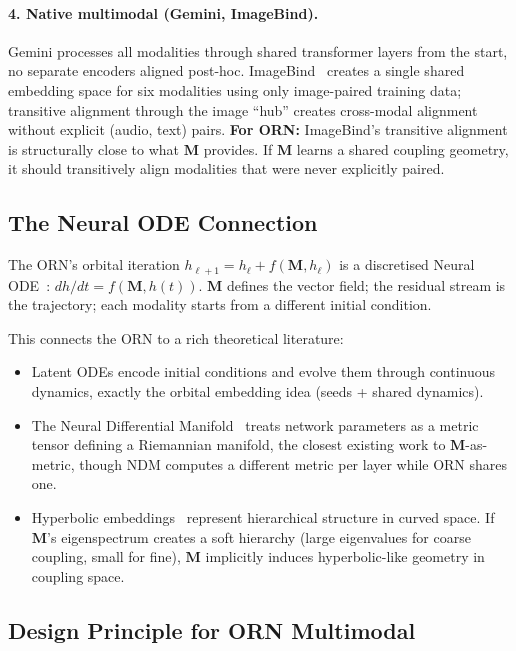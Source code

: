 \documentclass[11pt, a4paper]{article}
\newcommand{\M}{\mathbf{M}}
\theoremstyle{plain}
\theoremstyle{remark}
\begin{document}
\paragraph{4. Native multimodal (Gemini, ImageBind).}
Gemini processes all modalities through shared transformer layers from the start, no separate encoders aligned post-hoc.
ImageBind~\cite{fang2023imagebind} creates a single shared embedding space for six modalities using only image-paired training data; transitive alignment through the image ``hub'' creates cross-modal alignment without explicit (audio, text) pairs.
\textbf{For ORN:} ImageBind's transitive alignment is structurally close to what $\M$ provides.
If $\M$ learns a shared coupling geometry, it should transitively align modalities that were never explicitly paired.

\subsection{The Neural ODE Connection}

The ORN's orbital iteration $h_{\ell+1} = h_\ell + f(\M, h_\ell)$ is a discretised Neural ODE~\cite{chen2018neural}: $dh/dt = f(\M, h(t))$.
$\M$ defines the vector field; the residual stream is the trajectory; each modality starts from a different initial condition.

This connects the ORN to a rich theoretical literature:
\begin{itemize}[nosep]
    \item Latent ODEs encode initial conditions and evolve them through continuous dynamics, exactly the orbital embedding idea (seeds + shared dynamics).
    \item The Neural Differential Manifold~\cite{ndm2025} treats network parameters as a metric tensor defining a Riemannian manifold, the closest existing work to $\M$-as-metric, though NDM computes a different metric per layer while ORN shares one.
    \item Hyperbolic embeddings~\cite{nickel2017poincare} represent hierarchical structure in curved space. If $\M$'s eigenspectrum creates a soft hierarchy (large eigenvalues for coarse coupling, small for fine), $\M$ implicitly induces hyperbolic-like geometry in coupling space.
\end{itemize}

\subsection{Design Principle for ORN Multimodal}
\end{document}

